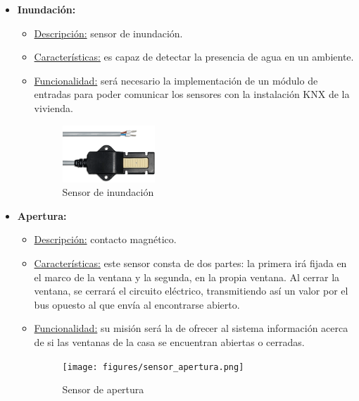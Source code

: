 \begin{itemize}
\item \textbf{Inundación:} 
	\begin{itemize}
	\item\underline{Descripción:} sensor de inundación.
	\item \underline{Características:} es capaz de detectar la presencia de agua en un ambiente.
	\item \underline{Funcionalidad:} será necesario la implementación de un módulo de entradas para poder comunicar los sensores con la instalación KNX de la vivienda.
	\begin{figure}[H]
	\centering
	\includegraphics[width=0.35\textwidth]{figures/sensor_inundacion.png}   
	\caption{Sensor de inundación}
	\label{fig:sensor_inundacion}
	\end{figure}
	\end{itemize} 

\item \textbf{Apertura:} 
	\begin{itemize}
	\item\underline{Descripción:} contacto magnético.
	\item \underline{Características:} este sensor consta de dos partes: la primera irá fijada en el marco de la ventana y la segunda, en la propia ventana. Al cerrar la ventana, se cerrará el circuito eléctrico, transmitiendo así un valor por el bus opuesto al que envía al encontrarse abierto.
	\item \underline{Funcionalidad:} su misión será la de ofrecer al sistema información acerca de si las ventanas de la casa se encuentran abiertas o cerradas.
	\begin{figure}[H]
	\centering
	\texttt{[image: figures/sensor\_apertura.png]}   
	\caption{Sensor de apertura}
	\label{fig:sensor_apertura}
	\end{figure}
	\end{itemize} 


\end{itemize}
